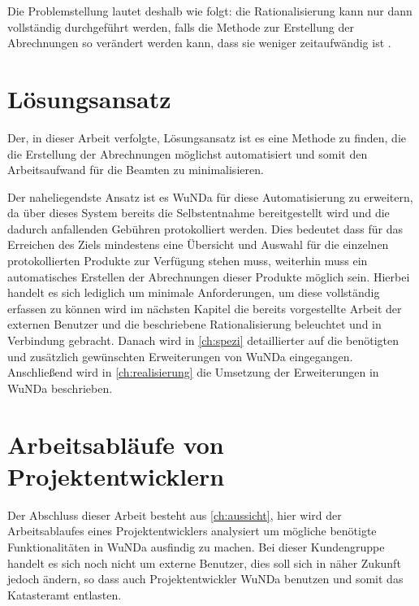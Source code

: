 Die Problemstellung lautet deshalb wie folgt: die Rationalisierung kann nur dann vollständig durchgeführt werden, falls die Methode zur Erstellung der Abrechnungen so verändert werden kann, dass sie weniger zeitaufwändig ist \autocite[vgl.][]{sander-abrechnung}. 


\section{Lösungsansatz}

Der, in dieser Arbeit verfolgte, Lösungsansatz ist es eine Methode zu finden, die die Erstellung der Abrechnungen möglichst automatisiert und somit den Arbeitsaufwand für die Beamten zu minimalisieren. 

Der naheliegendste Ansatz ist es \acs{WuNDa} für diese Automatisierung zu erweitern, da über dieses System bereits die Selbstentnahme bereitgestellt wird und die dadurch anfallenden Gebühren protokolliert werden.
Dies bedeutet dass für das Erreichen des Ziels mindestens eine Übersicht und Auswahl für die einzelnen protokollierten Produkte zur Verfügung stehen muss, weiterhin muss ein automatisches Erstellen der Abrechnungen dieser Produkte möglich sein.
Hierbei handelt es sich lediglich um minimale Anforderungen, um diese vollständig erfassen zu können wird im nächsten Kapitel die bereits vorgestellte Arbeit der externen Benutzer und die beschriebene Rationalisierung beleuchtet und in Verbindung gebracht.
Danach wird in \autoref{ch:spezi} detaillierter auf die benötigten und zusätzlich gewünschten Erweiterungen von \ac{WuNDa} eingegangen.
Anschließend wird in \autoref{ch:realisierung} die Umsetzung der Erweiterungen in \ac{WuNDa} beschrieben.

\section{Arbeitsabläufe von Projektentwicklern}
Der Abschluss dieser Arbeit besteht aus \autoref{ch:aussicht}, hier wird der Arbeitsablaufes eines Projektentwicklers analysiert um mögliche benötigte Funktionalitäten in \ac{WuNDa} ausfindig zu machen.
Bei dieser Kundengruppe handelt es sich noch nicht um externe Benutzer, dies soll sich in näher Zukunft jedoch ändern, so dass auch Projektentwickler \ac{WuNDa} benutzen und somit das Katasteramt entlasten.


